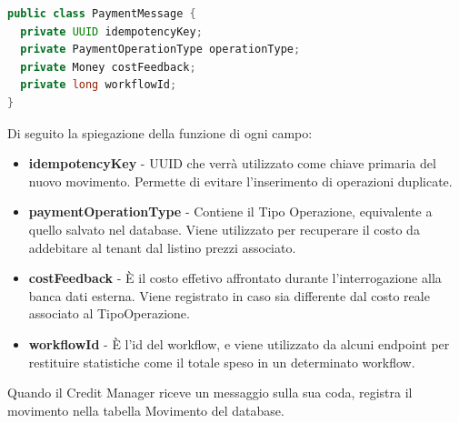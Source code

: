 \begin{lstlisting}[language=Java]
public class PaymentMessage {
  private UUID idempotencyKey;
  private PaymentOperationType operationType;
  private Money costFeedback;
  private long workflowId;
}
\end{lstlisting}
Di seguito la spiegazione della funzione di ogni campo:
\begin{itemize}
  \item \textbf{idempotencyKey} - UUID che verr\`a utilizzato come chiave primaria del nuovo movimento. Permette di evitare l'inserimento
    di operazioni duplicate.
  \item \textbf{paymentOperationType} - Contiene il Tipo Operazione, equivalente a quello salvato nel database. Viene utilizzato per recuperare il costo da addebitare
    al tenant dal listino prezzi associato.
  \item \textbf{costFeedback} - \`E il costo effetivo affrontato durante l'interrogazione alla banca dati esterna. Viene registrato in caso sia differente dal costo reale associato al TipoOperazione.
  \item \textbf{workflowId} - \`E l'id del workflow, e viene utilizzato da alcuni endpoint per restituire statistiche come il totale speso in un determinato workflow.
\end{itemize}
Quando il Credit Manager riceve un messaggio sulla sua coda, registra il movimento nella tabella Movimento del database.


